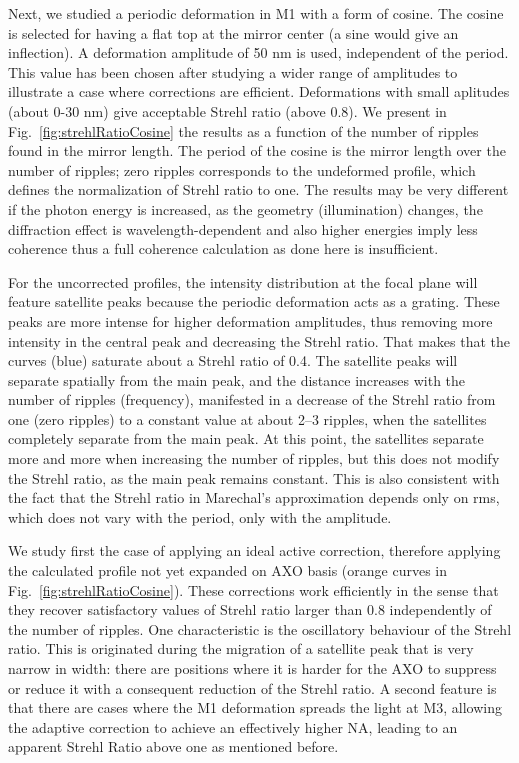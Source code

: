 \documentclass{iucr}
\newcommand{\inblue}[1]{{\color{black}#1}}
\begin{document}
Next, we studied a periodic deformation in M1 with a form of cosine. The cosine is selected for having a flat top at the mirror center (a sine would give an inflection). \inblue{A }
deformation amplitude of 50 nm \inblue{is used}, independent of the period. This value has been chosen after studying a wider range of amplitudes to illustrate a case where corrections are efficient. \inblue{Deformations with small aplitudes (about 0-30 nm) give acceptable Strehl ratio (above 0.8).} We present in Fig.~\ref{fig:strehlRatioCosine} the results as a function of the number of ripples found in the mirror length. The period of the cosine is the mirror length over the number of ripples; zero ripples corresponds to the undeformed profile, which defines the normalization of Strehl ratio to one. The results may be very different if the photon energy is increased, as the geometry (illumination) changes, the diffraction effect is wavelength-dependent and also higher energies imply less coherence thus a  full coherence calculation as done here is insufficient.

For the uncorrected profiles, the intensity distribution at the focal plane will feature satellite peaks because the periodic deformation acts as a grating. These peaks are more intense for higher deformation amplitudes, thus removing more intensity in the central peak and decreasing the Strehl ratio. That makes that the curves (blue) saturate about a Strehl ratio of 0.4. The satellite peaks will separate spatially from the main peak, and the distance increases with the number of ripples (frequency), manifested in a decrease of the Strehl ratio from one (zero ripples) to a constant value at about 2--3 ripples, when the satellites completely separate from the main peak. At this point, the satellites separate more and more when increasing the number of ripples, but this does not modify the Strehl ratio, as the main peak remains constant. This is also consistent with the fact that the Strehl ratio in Marechal's approximation depends only on rms, which does not vary with the period, only with the amplitude.

We study first the case of applying an ideal active correction, therefore applying the calculated profile not yet expanded on AXO basis (orange curves in Fig.~\ref{fig:strehlRatioCosine}). These corrections work efficiently in the sense that they recover satisfactory values of Strehl ratio larger than 0.8 independently of the number of ripples. One characteristic is the oscillatory behaviour of the Strehl ratio. This is originated during the migration of a satellite peak that is very narrow in width: there are positions where it is harder for the AXO to suppress or reduce it with a consequent reduction of the Strehl ratio. A second feature is that there are cases where the M1 deformation spreads the light at M3, allowing the adaptive correction to achieve an effectively higher NA, leading to an apparent Strehl Ratio above one as mentioned before.
\end{document}
